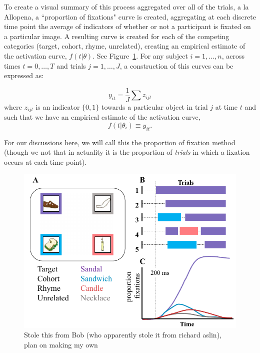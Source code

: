 \documentclass{article}
\begin{document}
To create a visual summary of this process aggregated over all of the trials, a la Allopena, a ``proportion of fixations" curve is created, aggregating at each discrete time point the average of indicators of whether or not a participant is fixated on a particular image. A resulting curve is created for each of the competing categories (target, cohort, rhyme, unrelated), creating an empirical estimate of the activation curve, $f(t|\theta)$. See Figure~\ref{fig:bob_diagram_full}. For any subject $i = 1, \dots, n$, across times $t = 0, \dots, T$ and trials $j = 1, \dots, J$, a construction  of this curves can be expressed as:


\begin{equation}\label{eq:sum_proportions}
y_{it} = \frac1J \sum z_{ijt}
\end{equation}
where $z_{ijt}$ is an indicator $\{0, 1\}$  towards a particular object in trial $j$ at time $t$ and such that we have an empirical estimate of the activation curve,
\begin{equation}\label{eq:empir_to_activation}
f(t | \theta_i) \equiv y_{it}.
\end{equation}



For our discussions here, we will call this the proportion of fixation method (though we not that in actuality it is the proportion of \textit{trials} in which a fixation occurs at each time point).


\begin{figure}[H]
\centering
\includegraphics[scale=0.45]{bob_vwp_full.png}
\caption{Stole this from Bob (who apparently stole it from richard aslin), plan on making my own}
\label{fig:bob_diagram_full}
\end{figure}
\end{document}

